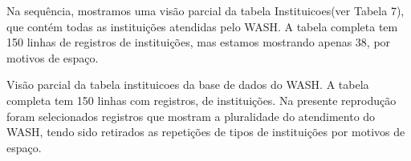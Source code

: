 \documentclass[
12pt,		%
openright,	%
twoside,  %
a4paper,			%
chapter=TITLE,		%
english,			%
french,				%
spanish,			%
brazil				%
]{USPSC-classe/USPSC}
\begin{document}
Na sequ\^encia, mostramos uma vis\~ao parcial da tabela \textquotedbl Instituicoes\textquotedbl  (ver Tabela 7), que cont\'em todas as institui\c{c}\~oes atendidas pelo WASH. A tabela completa tem 150 linhas de registros de institui\c{c}\~oes, mas estamos mostrando apenas 38, por motivos de espa\c{c}o.













\begin{table}[htb]
\tiny
\caption{\label{89e4a4c81cad3904f1348ca629486a33cc2c9bb6}Vis\~ao parcial da tabela instituicoes da base de dados do WASH. A tabela completa tem 150 linhas com registros, de institui\c{c}\~oes. Na presente reprodu\c{c}\~ao foram selecionados registros que mostram a pluralidade do atendimento do WASH, tendo sido retirados as repeti\c{c}\~oes de tipos de institui\c{c}\~oes por motivos de espa\c{c}o.}


\end{table}
\end{document}

